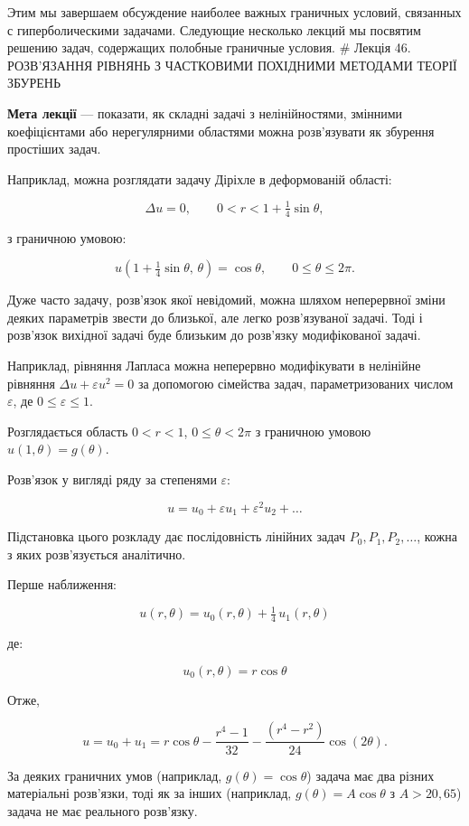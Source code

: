 \documentclass[
  ukrainian,
]{article}
\begin{document}
Этим мы завершаем обсуждение наиболее важных граничных условий,
связанных с гиперболическими задачами. Следующие несколько лекций мы
посвятим решению задач, содержащих полобные граничные условия. ﻿\# Лекція
46. РОЗВ'ЯЗАННЯ РІВНЯНЬ З ЧАСТКОВИМИ ПОХІДНИМИ МЕТОДАМИ ТЕОРІЇ ЗБУРЕНЬ

\textbf{Мета лекції} --- показати, як складні задачі з нелінійностями,
змінними коефіцієнтами або нерегулярними областями можна розв'язувати як
збурення простіших задач.

Наприклад, можна розглядати задачу Діріхле в деформованій області:

\[
\Delta u = 0, \qquad 0 < r < 1 + \tfrac{1}{4}\sin\theta,
\]

з граничною умовою:

\[
u\!\left(1+\tfrac{1}{4}\sin\theta,\,\theta\right) = \cos\theta, \qquad 0 \le \theta \le 2\pi.
\]

Дуже часто задачу, розв'язок якої невідомий, можна шляхом неперервної
зміни деяких параметрів звести до близької, але легко розв'язуваної
задачі. Тоді і розв'язок вихідної задачі буде близьким до розв'язку
модифікованої задачі.

Наприклад, рівняння Лапласа можна неперервно модифікувати в нелінійне
рівняння \(\Delta u + \varepsilon u^2 = 0\) за допомогою сімейства
задач, параметризованих числом \(\varepsilon\), де
\(0 \le \varepsilon \le 1\).

Розглядається область \(0 < r < 1\), \(0 \le \theta < 2\pi\) з граничною
умовою \(u(1,\theta) = g(\theta)\).

Розв'язок у вигляді ряду за степенями \(\varepsilon\):

\[
u = u_0 + \varepsilon u_1 + \varepsilon^2 u_2 + \dots
\]

Підстановка цього розкладу дає послідовність лінійних задач
\(P_0, P_1, P_2, \ldots\), кожна з яких розв'язується аналітично.

Перше наближення:

\[
u(r,\theta) = u_0(r,\theta) + \tfrac{1}{4}\,u_1(r,\theta)
\]

де:

\[
u_0(r,\theta) = r\cos\theta
\]

Отже,

\[
u = u_0 + u_1 = r\cos\theta - \frac{r^4-1}{32} - \frac{(r^4-r^2)}{24}\cos(2\theta).
\]

За деяких граничних умов (наприклад, \(g(\theta) = \cos\theta\)) задача
має два різних матеріальні розв'язки, тоді як за інших (наприклад,
\(g(\theta) = A\cos\theta\) з \(A > 20{,}65\)) задача не має реального
розв'язку.
\end{document}

